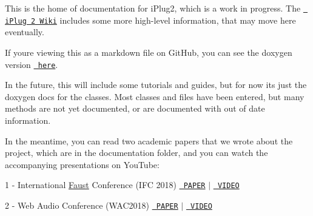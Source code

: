 This is the home of documentation for i\+Plug2, which is a work in progress. The \href{https://github.com/iPlug2/iPlug2/wiki}{\texttt{ i\+Plug 2 Wiki}} includes some more high-\/level information, that may move here eventually.

If you\textquotesingle{}re viewing this as a markdown file on Git\+Hub, you can see the doxygen version \href{https://iplug2.github.io/docs/}{\texttt{ here}}.

In the future, this will include some tutorials and guides, but for now it\textquotesingle{}s just the doxygen docs for the classes. Most classes and files have been entered, but many methods are not yet documented, or are documented with out of date information.

In the meantime, you can read two academic papers that we wrote about the project, which are in the documentation folder, and you can watch the accompanying presentations on You\+Tube\+:

1 -\/ International \mbox{\hyperlink{struct_faust}{Faust}} Conference (I\+FC 2018) \href{https://github.com/iPlug2/iPlug2/raw/master/Documentation/Papers/IFC2018.pdf}{\texttt{ P\+A\+P\+ER}} $\vert$ \href{https://youtu.be/SLHGxBYeID4}{\texttt{ V\+I\+D\+EO}}

2 -\/ Web Audio Conference (W\+A\+C2018) \href{https://github.com/iPlug2/iPlug2/raw/master/Documentation/Papers/WAC2018.pdf}{\texttt{ P\+A\+P\+ER}} $\vert$ \href{https://youtu.be/DDrgW4Qyz8Y}{\texttt{ V\+I\+D\+EO}} 